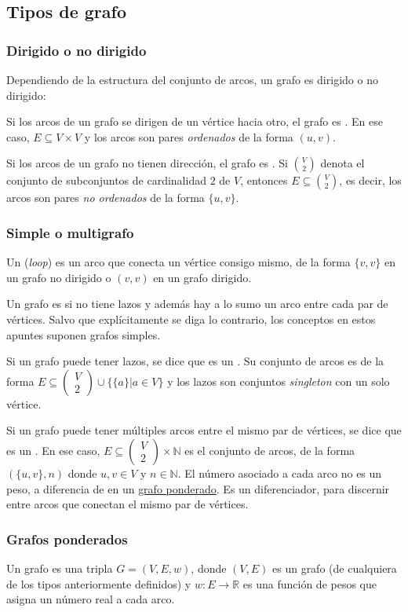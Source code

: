 \subsection{Tipos de grafo}
\label{sec:tipos_de_grafo}

\subsubsection{Dirigido o no dirigido}
\label{sec:dirigido_vs_no_dirigido}

Dependiendo de la estructura del conjunto de arcos, un grafo es dirigido o no dirigido:

Si los arcos de un grafo se dirigen de un vértice hacia otro, el grafo es . En ese caso, $E \subseteq V \times V$ y los arcos son pares \emph{ordenados} de la forma $(u,v)$.

Si los arcos de un grafo no tienen dirección, el grafo es . Si $\binom{V}{2}$ denota el conjunto de subconjuntos de cardinalidad $2$ de $V$, entonces $E \subseteq \binom{V}{2}$, es decir, los arcos son pares \emph{no ordenados} de la forma $\{u,v\}$.

\subsubsection{Simple o multigrafo}
\label{sec:simple_o_multigrafo}

Un  (\textit{loop}) es un arco que conecta un vértice consigo mismo, de la forma $\{v, v\}$ en un grafo no dirigido o $(v, v)$ en un grafo dirigido.

Un grafo es  si no tiene lazos y además hay a lo sumo un arco entre cada par de vértices. Salvo que explícitamente se diga lo contrario, los conceptos en estos apuntes suponen grafos simples.

Si un grafo puede tener lazos, se dice que es un . Su conjunto de arcos es de la forma $E \subseteq \begin{pmatrix} V\\2 \end{pmatrix} \cup \{\{a\}|a\in V\}$ y los lazos son conjuntos \textit{singleton} con un solo vértice.

Si un grafo puede tener múltiples arcos entre el mismo par de vértices, se dice que es un . En ese caso, $E \subseteq \begin{pmatrix} V\\2 \end{pmatrix} \times \mathbb{N}$ es el conjunto de arcos, de la forma $(\{u, v\}, n)$ donde $u,v\in V$ y $n \in \mathbb{N}$. El número asociado a cada arco no es un peso, a diferencia de en un \hyperref[sec:grafos_ponderados]{grafo ponderado}. Es un diferenciador, para discernir entre arcos que conectan el mismo par de vértices.

\subsubsection{Grafos ponderados}
\label{sec:grafos_ponderados}

Un grafo  es una tripla $G = (V, E, w)$, donde $(V, E)$ es un grafo (de cualquiera de los tipos anteriormente definidos) y $w\colon E \to \mathbb{R}$ es una función de pesos que asigna un número real a cada arco.
